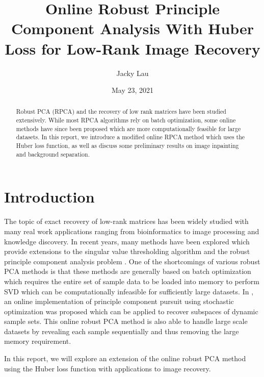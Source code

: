 \documentclass[a4paper,11pt]{article}
\title{Online Robust Principle Component Analysis With Huber Loss for Low-Rank
Image Recovery}
\author{
  Jacky Lau
}
\date{May 23, 2021}
\begin{document}
\thispagestyle{plain}
\maketitle


\begin{abstract}
  \noindent Robust PCA (RPCA) and the recovery of low rank matrices have been
  studied extensively. While most RPCA algorithms rely on batch optimization,
  some online methods have since been proposed which are more computationally
  feasible for large datasets. In this report, we introduce a modified online
  RPCA method which uses the Huber loss function, as well as discuss some
  preliminary results on image inpainting and background separation.
\end{abstract}

\section{Introduction}
The topic of exact recovery of low-rank matrices has been widely studied with
many real work applications ranging from bioinformatics to image processing and
knowledge discovery. In recent years, many methods have been explored which
provide extensions to the singular value thresholding algorithm
\cite{cai2008singular} and the robust principle component analysis problem
\cite{NIPS2009}. One of the shortcomings of various robust PCA methods is that
these methods are generally based on batch optimization which requires the entire
set of sample data to be loaded into memory to perform SVD which can be
computationally infeasible for sufficiently large datasets. In \cite{FengORPCA},
an online implementation of principle component pursuit \cite{NIPS2009} using
stochastic optimization was proposed which can be applied to recover subspaces
of dynamic sample sets. This online robust PCA method is also able to handle
large scale datasets by revealing each sample sequentially and thus removing the
large memory requirement.

In this report, we will explore an extension of the online robust PCA method
using the Huber loss function \cite{Huber} with applications to image recovery.
\end{document}
